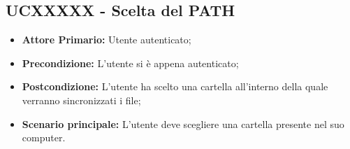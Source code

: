 \subsection{UCXXXXX - Scelta del PATH}
\label{UCXXXXX}
\begin{itemize}
\item \textbf{Attore Primario:} Utente autenticato;
\item \textbf{Precondizione:} L'utente si è appena autenticato;
\item \textbf{Postcondizione:} L'utente ha scelto una cartella all'interno della quale verranno sincronizzati i file;
\item \textbf{Scenario principale:} L'utente deve scegliere una cartella presente nel suo computer.
\end{itemize}